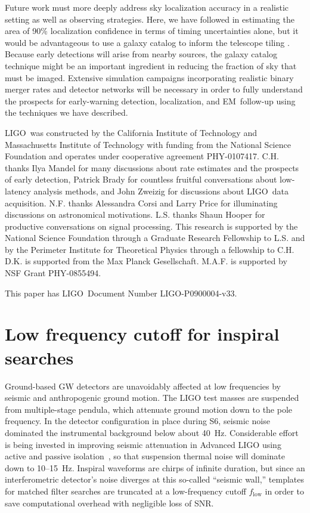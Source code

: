 \documentclass[preprint2]{aastex}
\newcommand{\EM}{EM}%
\newcommand{\LIGO}{LIGO}%
\begin{document}
Future work must more deeply address sky localization accuracy in a
realistic setting as well as observing strategies. Here, we have followed
\citet{Fairhurst2009} in estimating the area of 90\% localization confidence in
terms of timing uncertainties alone, but it would be advantageous to use a
galaxy catalog to inform the telescope tiling \citep{galaxy-catalog}. Because
early detections will arise from nearby sources, the galaxy catalog technique
might be an important ingredient in reducing the fraction of sky that must be
imaged.  Extensive simulation campaigns incorporating realistic binary merger
rates and detector networks will be necessary in order to fully understand the
prospects for early-warning detection, localization, and \EM\ follow-up using
the techniques we have described.

\acknowledgements

\LIGO\ was constructed by the California Institute of Technology and
Massachusetts Institute of Technology with funding from the National Science
Foundation and operates under cooperative agreement PHY-0107417.  C.H. thanks Ilya Mandel for many discussions about rate estimates and the prospects
of early detection, Patrick Brady for countless fruitful conversations about low-latency analysis methods, and John Zweizig for discussions about \LIGO\ data
acquisition.  N.F. thanks Alessandra Corsi and Larry Price for
illuminating discussions on astronomical motivations.  L.S. thanks Shaun
Hooper for productive conversations on signal processing.  This research is
supported by the National Science Foundation through a Graduate Research
Fellowship to L.S. and by the Perimeter Institute for Theoretical Physics through
a fellowship to C.H. D.K. is supported from the Max Planck Gesellschaft.
M.A.F. is supported by NSF Grant PHY-0855494.

This paper has \LIGO\ Document Number {LIGO-P0900004-v33}.

\appendix

\section{\label{sec:low-frequency-cutoff}Low frequency cutoff for inspiral searches}

Ground-based GW detectors are unavoidably affected at low frequencies by seismic and anthropogenic ground motion.  The LIGO test masses are suspended from multiple-stage pendula, which attenuate ground motion down to the pole frequency.  In the detector configuration in place during S6, seismic noise dominated the instrumental background below about 40~Hz.  Considerable effort is being invested in improving seismic attenuation in Advanced LIGO using active and passive isolation~\citep{0264-9381-27-8-084006}, so that suspension thermal noise will dominate down to 10--15~Hz.  Inspiral waveforms are chirps of infinite duration, but since an interferometric detector's noise diverges at this so-called ``seismic wall,'' templates for matched filter searches are truncated at a low-frequency cutoff $f_\mathrm{low}$ in order to save computational overhead with negligible loss of SNR.
\end{document}
